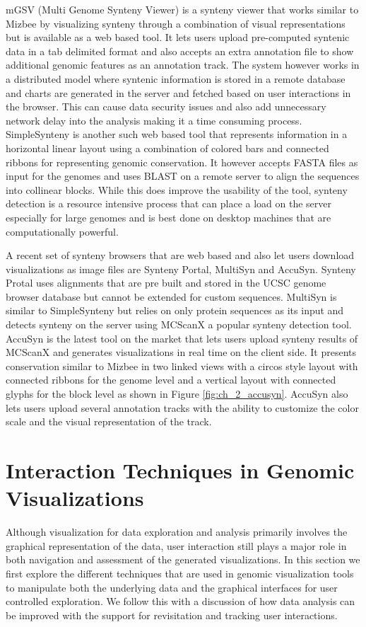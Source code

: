 mGSV (Multi Genome Synteny Viewer) is a synteny viewer that works similar to Mizbee by visualizing synteny through a combination of visual representations but is available as a web based tool\cite{revanna2011gsv}. It lets users upload pre-computed syntenic data in a tab delimited format and also accepts an extra annotation file to show additional genomic features as an annotation track. The system however works in a distributed model where syntenic information is stored in a remote database and charts are generated in the server and fetched based on user interactions in the browser. This can cause data security issues and also add unnecessary network delay into the analysis making it a time consuming process. SimpleSynteny is another such web based tool that represents information in a horizontal linear layout using a combination of colored bars and connected ribbons for representing genomic conservation\cite{veltri2016simplesynteny}. It however accepts FASTA files as input for the genomes and uses BLAST\cite{blasttool} on a remote server to align the sequences into collinear blocks. While this does improve the usability of the tool, synteny detection is a resource intensive process that can place a load on the server especially for large genomes and is best done on desktop machines that are computationally powerful.

A recent set of synteny browsers that are web based and also let users download visualizations as image files are Synteny Portal, MultiSyn and AccuSyn. Synteny Protal uses alignments that are pre built and stored in the UCSC genome browser database but cannot be extended for custom sequences\cite{lee2016syntenyportal}. MultiSyn\cite{baek2016multisyn} is similar to SimpleSynteny but relies on only protein sequences as its input and detects synteny on the server using MCScanX\cite{wang2012mcscanx} a popular synteny detection tool. AccuSyn\cite{accusyn} is the latest tool on the market that lets users upload synteny results of MCScanX and generates visualizations in real time on the client side. It presents conservation similar to Mizbee in two linked views with a circos style layout with connected ribbons for the genome level and a vertical layout with connected glyphs for the block level as shown in Figure \ref{fig:ch_2_accusyn}. AccuSyn also lets users upload several annotation tracks with the ability to customize the color scale and the visual representation of the track.

\section{Interaction Techniques in Genomic Visualizations}
Although visualization for data exploration and analysis primarily involves the graphical representation of the data, user interaction still plays a major role in both navigation and assessment of the generated visualizations.  In this section we first explore the different techniques that are used in genomic visualization tools to manipulate both the underlying data and the graphical interfaces for user controlled exploration. We follow this with a discussion of how data analysis can be improved with the support for revisitation and tracking user interactions.

